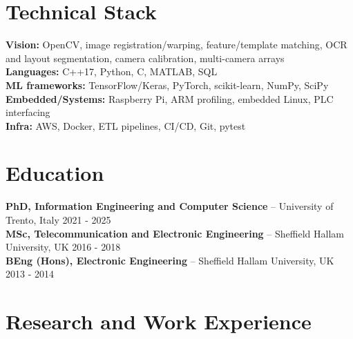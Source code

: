 \documentclass[11pt]{article}
\begin{document}
\section*{Technical Stack}
\textbf{Vision:} OpenCV, image registration/warping, feature/template matching, OCR and layout
segmentation, camera calibration, multi-camera arrays \\
\textbf{Languages:} C++17, Python, C, MATLAB, SQL \\
\textbf{ML frameworks:} TensorFlow/Keras, PyTorch, scikit-learn, NumPy, SciPy \\
\textbf{Embedded/Systems:} Raspberry Pi, ARM profiling, embedded Linux, PLC interfacing \\
\textbf{Infra:} AWS, Docker, ETL pipelines, CI/CD, Git, pytest

\section*{Education}
\textbf{PhD, Information Engineering and Computer Science} -- University of Trento, Italy \hfill 2021 - 2025 \\
\textbf{MSc, Telecommunication and Electronic Engineering} -- Sheffield Hallam University, UK \hfill 2016 - 2018 \\
\textbf{BEng (Hons), Electronic Engineering} -- Sheffield Hallam University, UK \hfill 2013 - 2014

\section*{Research and Work Experience}
\end{document}
